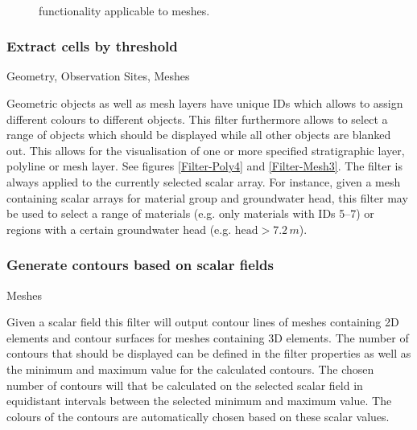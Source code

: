 \begin{figure}[tb]
\begin{center}
\enspace
{} \\
\enspace
{}
\end{center}
\caption{\ogs functionality applicable to meshes.} \label{fig:filter:mesh}
\end{figure}

\subsubsection{Extract cells by threshold}
 Geometry, Observation Sites, Meshes

 Geometric objects as well as mesh layers have unique IDs which allows to assign different colours to different objects. This filter furthermore allows to select a range of objects which should be displayed while all other objects are blanked out. This allows for the visualisation of one or more specified stratigraphic layer, polyline or mesh layer. See figures \ref{Filter-Poly4} and \ref{Filter-Mesh3}. The filter is always applied to the currently selected scalar array. For instance, given a mesh containing scalar arrays for material group and groundwater head, this filter may be used to select a range of materials (e.g. only materials with IDs 5--7) or regions with a certain groundwater head (e.g. $\text{head}>7.2\,m$).

\subsubsection{Generate contours based on scalar fields}
 Meshes

 Given a scalar field this filter will output contour lines of meshes containing 2D elements and contour surfaces for meshes containing 3D elements. The number of contours that should be displayed can be defined in the filter properties as well as the minimum and maximum value for the calculated contours. The chosen number of contours will that be calculated on the selected scalar field in equidistant intervals between the selected minimum and maximum value. The colours of the contours are automatically chosen based on these scalar values.

